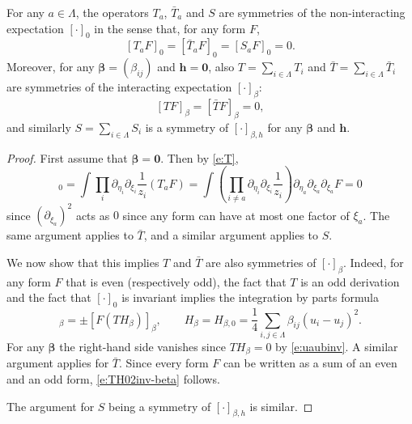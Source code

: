 \documentclass[11pt]{amsart}
\numberwithin{equation}{section}
\numberwithin{theorem}{section}
\newcommand{\ob}[1]{\left(#1\right )} %
\newcommand{\cb}[1]{\left[#1\right ]} %
\newcommand{\V}[1]{\boldsymbol{#1}}
\begin{document}
\begin{lemma}
  \label{lem:hypsym}
  For any $a \in\Lambda$, the operators $T_a$, $\bar T_a$ and $S$ are
  symmetries of the non-interacting expectation
  $[\cdot]_0$ in the sense that, for any form $F$,
  \begin{equation} \label{e:TH02inv-0}
    [T_aF]_0 = [\bar T_a F]_0 = [S_aF]_0 = 0.
  \end{equation}
  Moreover, for any $\V{\beta}=(\beta_{ij})$ and $\V{h} = \V{0}$, also
  $T = \sum_{i\in\Lambda} T_i$ and $\bar T = \sum_{i\in\Lambda} \bar
  T_i$ are symmetries of the interacting expectation $[\cdot]_\beta$: 
  \begin{equation} 
    \label{e:TH02inv-beta}
    [TF]_\beta = [\bar T F]_\beta = 0,
  \end{equation}
  and similarly $S = \sum_{i\in\Lambda} S_i$ is a symmetry of $[\cdot]_{\beta,h}$
    for any $\V{\beta}$ and $\V{h}$.
\end{lemma}

\begin{proof}
  First assume that $\V{\beta}=\V{0}$. Then by \eqref{e:T},
  \begin{equation}
    [T_a F]_0
    = \int \prod_i \partial_{\eta_i} \partial_{\xi_i} \frac{1}{z_i} (T_aF)
    = \int \ob{\prod_{i\neq a} \partial_{\eta_i} \partial_{\xi_i} \frac{1}{z_i}} \partial_{\eta_a} \partial_{\xi_a} \partial_{\xi_a} F = 0
  \end{equation}
  since $(\partial_{\xi_a})^2$ acts as $0$ since any form can have at
  most one factor of $\xi_a$.  The same argument applies to $\bar T$,
  and a similar argument applies to $S$.
  
  We now show that this implies $T$ and $\bar T$ are also symmetries
  of $[\cdot]_\beta$.  Indeed, for any form $F$ that is even
  (respectively odd), the fact that $T$ is an odd derivation and the fact that
  $[\cdot]_0$ is invariant implies the integration by parts formula
  \begin{equation}
    [TF]_\beta = \pm [F(TH_{\beta})]_\beta, \qquad H_{\beta} =
    H_{\beta,0} = \frac14 \sum_{i,j\in\Lambda} \beta_{ij} (u_i-u_j)^2.
  \end{equation}
  For any $\V{\beta}$ the right-hand side vanishes since $TH_{\beta} = 0$ by
  \eqref{e:uaubinv}. A similar argument applies for $\bar T$.  Since
  every form $F$ can be written as a sum of an even and an odd form,
  \eqref{e:TH02inv-beta} follows. 

  The argument for $S$ being a symmetry of $\cb{\cdot}_{\beta,h}$ is similar.
\end{proof}
\end{document}
